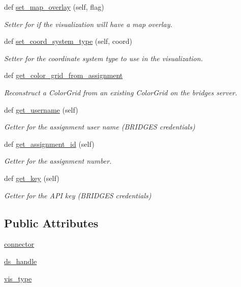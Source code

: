 \begin{DoxyCompactItemize}
def \mbox{\hyperlink{classbridges_1_1bridges_1_1_bridges_ae9ed34b5878d9d120949da0b7e4d2911}{set\+\_\+map\+\_\+overlay}} (self, flag)
\begin{DoxyCompactList}\small\item\em Setter for if the visualization will have a map overlay. \end{DoxyCompactList}\item 
def \mbox{\hyperlink{classbridges_1_1bridges_1_1_bridges_a6bc905490b1995234f88f47af9aa8a17}{set\+\_\+coord\+\_\+system\+\_\+type}} (self, coord)
\begin{DoxyCompactList}\small\item\em Setter for the coordinate system type to use in the visualization. \end{DoxyCompactList}\item 
def \mbox{\hyperlink{classbridges_1_1bridges_1_1_bridges_a11c2be346fba56589955894c5f84747d}{get\+\_\+color\+\_\+grid\+\_\+from\+\_\+assignment}}
\begin{DoxyCompactList}\small\item\em Reconstruct a Color\+Grid from an existing Color\+Grid on the bridges server. \end{DoxyCompactList}\item 
def \mbox{\hyperlink{classbridges_1_1bridges_1_1_bridges_abf6fdb19db336c2ed14987fdd89d65fe}{get\+\_\+username}} (self)
\begin{DoxyCompactList}\small\item\em Getter for the assignment user name (B\+R\+I\+D\+G\+ES credentials) \end{DoxyCompactList}\item 
def \mbox{\hyperlink{classbridges_1_1bridges_1_1_bridges_a94f39f11368031ad33800aac0bac2f7d}{get\+\_\+assignment\+\_\+id}} (self)
\begin{DoxyCompactList}\small\item\em Getter for the assignment number. \end{DoxyCompactList}\item 
def \mbox{\hyperlink{classbridges_1_1bridges_1_1_bridges_afcdb0291c535b41fb7be31eaf5bf3677}{get\+\_\+key}} (self)
\begin{DoxyCompactList}\small\item\em Getter for the A\+PI key (B\+R\+I\+D\+G\+ES credentials) \end{DoxyCompactList}\end{DoxyCompactItemize}
\subsection*{Public Attributes}
\begin{DoxyCompactItemize}
\item 
\mbox{\hyperlink{classbridges_1_1bridges_1_1_bridges_a1c02ee44e7a4a3ee2f7d9c7d7da7d09f}{connector}}
\item 
\mbox{\hyperlink{classbridges_1_1bridges_1_1_bridges_a7a6f25612be64d4f3e203d7d37cb4da4}{ds\+\_\+handle}}
\item 
\mbox{\hyperlink{classbridges_1_1bridges_1_1_bridges_a5ca152bf3830e2be1f72247463916f82}{vis\+\_\+type}}
\end{DoxyCompactItemize}



